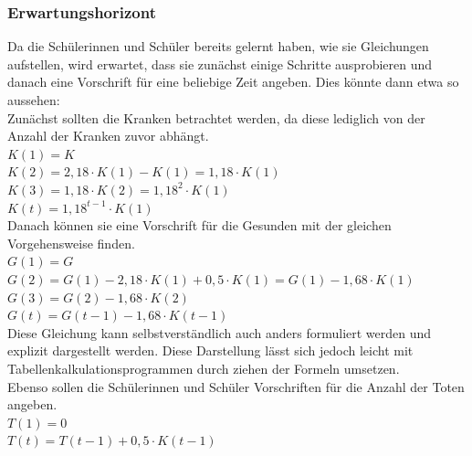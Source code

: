\subsubsection*{Erwartungshorizont}
Da die Schülerinnen und Schüler bereits gelernt haben, wie sie Gleichungen aufstellen, wird erwartet, dass sie zunächst einige Schritte ausprobieren und danach eine Vorschrift für eine beliebige Zeit angeben. Dies könnte dann etwa so aussehen:\\
Zunächst sollten die Kranken betrachtet werden, da diese lediglich von der Anzahl der Kranken zuvor abhängt.\\
$ K(1) = K$\\
$ K(2) = 2,18 \cdot K(1) - K(1) = 1,18 \cdot K(1)$\\
$ K(3) = 1,18 \cdot K(2) = 1,18^2 \cdot K(1)$\\
$ K(t) = 1,18^{t-1} \cdot K(1)$\\

Danach können sie eine Vorschrift für die Gesunden mit der gleichen Vorgehensweise finden.\\
$ G(1) = G$\\
$ G(2) = G(1) - 2,18 \cdot K(1) + 0,5 \cdot K(1) = G(1)- 1,68 \cdot K(1)$\\
$ G(3) = G(2) - 1,68 \cdot K(2)$\\
$ G(t) = G(t-1) - 1,68 \cdot K(t-1)$\\
Diese Gleichung kann selbstverständlich auch anders formuliert werden und explizit dargestellt werden. Diese Darstellung lässt sich jedoch leicht mit Tabellenkalkulationsprogrammen durch ziehen der Formeln umsetzen.\\

Ebenso sollen die Schülerinnen und Schüler Vorschriften für die Anzahl der Toten angeben.\\
$ T(1) = 0 $\\
$ T(t) = T(t-1) + 0,5 \cdot K(t-1)$\\


